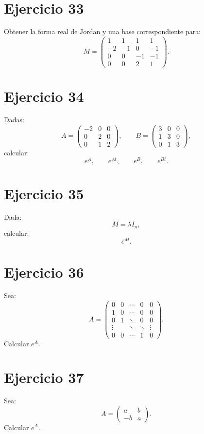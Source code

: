 \documentclass[11pt,a4paper]{article}
\begin{document}
\section{Ejercicio 33}
Obtener la forma real de Jordan y una base correspondiente para:
\[
M=
\begin{pmatrix}
1&1&1&1\\
-2&-1&0&-1\\
0&0&-1&-1\\
0&0&2&1
\end{pmatrix}.
\]

\section{Ejercicio 34}
Dadas:
\[
A=
\begin{pmatrix}
-2&0&0\\
0&2&0\\
0&1&2
\end{pmatrix},
\qquad
B=
\begin{pmatrix}
3&0&0\\
1&3&0\\
0&1&3
\end{pmatrix},
\]
calcular:
\[
e^A,\qquad e^{At},\qquad e^B,\qquad e^{Bt}.
\]

\section{Ejercicio 35}
Dada:
\[
M=\lambda I_n,
\]
calcular:
\[
e^M.
\]

\section{Ejercicio 36}
Sea:
\[
A=
\begin{pmatrix}
0&0&\cdots&0&0\\
1&0&\cdots&0&0\\
0&1&\ddots&0&0\\
\vdots&&\ddots&\ddots&\vdots\\
0&0&\cdots&1&0
\end{pmatrix}.
\]
Calcular $e^A$.

\section{Ejercicio 37}
Sea:
\[
A=
\begin{pmatrix}
a&b\\
-b&a
\end{pmatrix}.
\]
Calcular $e^A$.
\end{document}
